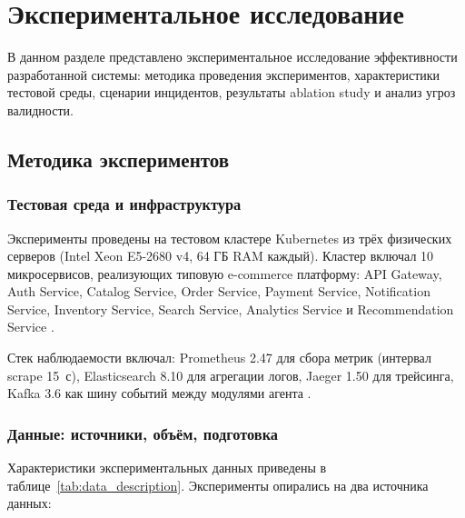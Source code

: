\chapter{Экспериментальное исследование}\label{ch:experiments}

В данном разделе представлено экспериментальное исследование эффективности разработанной системы: методика проведения экспериментов, характеристики тестовой среды, сценарии инцидентов, результаты ablation study и анализ угроз валидности.

\section{Методика экспериментов}

\subsection{Тестовая среда и инфраструктура}

Эксперименты проведены на тестовом кластере Kubernetes из трёх физических серверов (Intel Xeon E5-2680 v4, 64 ГБ RAM каждый). Кластер включал 10 микросервисов, реализующих типовую e-commerce платформу: API Gateway, Auth Service, Catalog Service, Order Service, Payment Service, Notification Service, Inventory Service, Search Service, Analytics Service и Recommendation Service \cite{burns_kubernetes,kubernetes_docs}.

Стек наблюдаемости включал: Prometheus 2.47 для сбора метрик (интервал scrape 15~с), Elasticsearch 8.10 для агрегации логов, Jaeger 1.50 для трейсинга, Kafka 3.6 как шину событий между модулями агента \cite{prometheus_docs,grafana_docs,opentelemetry_docs}.

\subsection{Данные: источники, объём, подготовка}

Характеристики экспериментальных данных приведены в таблице~\ref{tab:data_description}. Эксперименты опирались на два источника данных:

